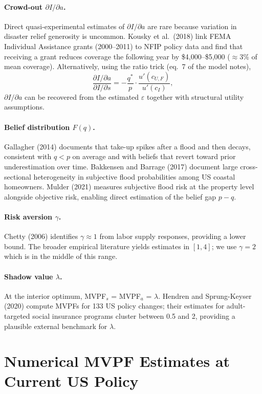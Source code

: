 \documentclass[12pt]{article}
\begin{document}
\paragraph{Crowd-out $\partial I / \partial a$.}
Direct quasi-experimental estimates of $\partial I/\partial a$ are rare because variation in disaster relief generosity is uncommon.
Kousky et al.\ (2018) link FEMA Individual Assistance grants (2000--2011) to NFIP policy data and find that receiving a grant reduces coverage the following year by \$4{,}000--\$5{,}000 ($\approx 3\%$ of mean coverage).
Alternatively, using the ratio trick (eq.~7 of the model notes),
\[
    \frac{\partial I/\partial a}{\partial I/\partial s} = -\frac{q^*}{p}\cdot\frac{u'(c_{U,F})}{u'(c_I)},
\]
$\partial I/\partial a$ can be recovered from the estimated $\varepsilon$ together with structural utility assumptions.

\paragraph{Belief distribution $F(q)$.}
Gallagher (2014) documents that take-up spikes after a flood and then decays, consistent with $q < p$ on average and with beliefs that revert toward prior underestimation over time.
Bakkensen and Barrage (2017) document large cross-sectional heterogeneity in subjective flood probabilities among US coastal homeowners.
Mulder (2021) measures subjective flood risk at the property level alongside objective risk, enabling direct estimation of the belief gap $p - q$.

\paragraph{Risk aversion $\gamma$.}
Chetty (2006) identifies $\gamma \approx 1$ from labor supply responses, providing a lower bound.
The broader empirical literature yields estimates in $[1, 4]$; we use $\gamma = 2$ which is in the middle of this range.

\paragraph{Shadow value $\lambda$.}
At the interior optimum, MVPF$_s$ = MVPF$_a$ = $\lambda$.
Hendren and Sprung-Keyser (2020) compute MVPFs for 133 US policy changes; their estimates for adult-targeted social insurance programs cluster between 0.5 and 2, providing a plausible external benchmark for $\lambda$.

\section*{Numerical MVPF Estimates at Current US Policy}
\end{document}
